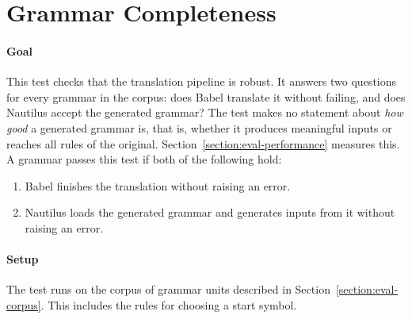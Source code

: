 \documentclass[thesis]{plai}
\begin{document}
\section{Grammar Completeness}
\label{paragraph:eval-completeness}
\paragraph{Goal}
This test checks that the translation pipeline is robust. It answers two questions for every grammar in the corpus: does Babel translate it without failing, and does Nautilus accept the generated grammar? The test makes no statement about \emph{how good} a generated grammar is, that is, whether it produces meaningful inputs or reaches all rules of the original. Section~\ref{section:eval-performance} measures this. A grammar passes this test if both of the following hold:
\begin{enumerate}
    \item Babel finishes the translation without raising an error.
    \item Nautilus loads the generated grammar and generates inputs from it without raising an error.
\end{enumerate}

\paragraph{Setup}
\label{paragraph:eval-completeness-setup}
The test runs on the corpus of grammar units described in Section~\ref{section:eval-corpus}. This includes the rules for choosing a start symbol.
\end{document}
